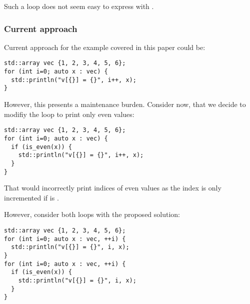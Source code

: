 Such a loop does not seem easy to express with .

\subsubsection{Current approach}

Current approach for the example covered in this paper could be:
\begin{lstlisting}
std::array vec {1, 2, 3, 4, 5, 6};
for (int i=0; auto x : vec) {
  std::println("v[{}] = {}", i++, x);
}
\end{lstlisting}

However, this presents a maintenance burden. Consider now, that we decide to
modifiy the loop to print only even values:

\begin{lstlisting}
std::array vec {1, 2, 3, 4, 5, 6};
for (int i=0; auto x : vec) {
  if (is_even(x)) {
    std::println("v[{}] = {}", i++, x);
  }
}
\end{lstlisting}

That would incorrectly print indices of even values as the index is only
incremented if  is .

However, consider both loops with the proposed solution:
\begin{lstlisting}
std::array vec {1, 2, 3, 4, 5, 6};
for (int i=0; auto x : vec, ++i) {
  std::println("v[{}] = {}", i, x);
}
for (int i=0; auto x : vec, ++i) {
  if (is_even(x)) {
    std::println("v[{}] = {}", i, x);
  }
}
\end{lstlisting}

